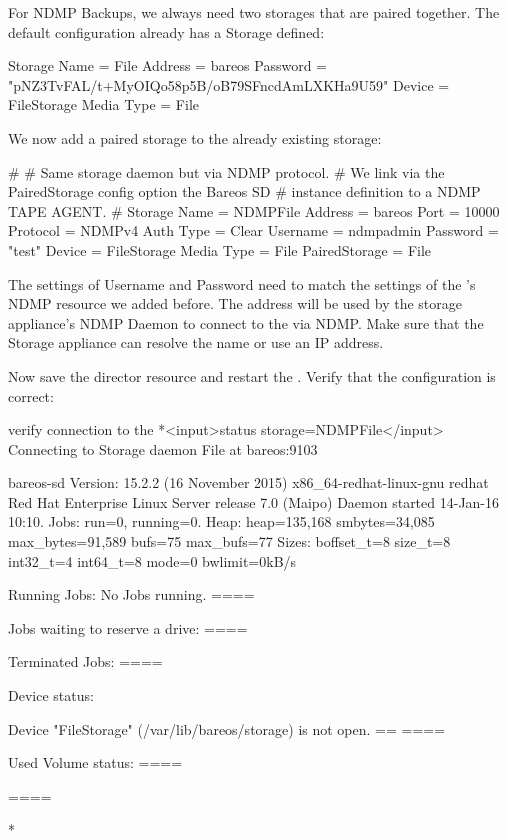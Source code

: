 For NDMP Backups, we always need two storages that are paired together.
The default configuration already has a Storage  defined:

\begin{bconfig}{}
Storage {
  Name = File
  Address = bareos
  Password = "pNZ3TvFAL/t+MyOIQo58p5B/oB79SFncdAmLXKHa9U59"
  Device = FileStorage
  Media Type = File
}
\end{bconfig}

We now add a paired storage to the already existing  storage:
\begin{bconfig}{}
#
# Same storage daemon but via NDMP protocol.
# We link via the PairedStorage config option the Bareos SD
# instance definition to a NDMP TAPE AGENT.
#
Storage {
  Name = NDMPFile
  Address = bareos
  Port = 10000
  Protocol = NDMPv4
  Auth Type = Clear
  Username = ndmpadmin
  Password = "test"
  Device = FileStorage
  Media Type = File
  PairedStorage = File
}
\end{bconfig}

The settings of Username and Password need to match the settings of the \bareosSd's NDMP resource we added before.
The address will be used by the storage appliance's NDMP Daemon to connect to the \bareosSd via NDMP.
Make sure that the Storage appliance can resolve the name or use an IP address.

Now save the director resource and restart the \bareosDir.
Verify that the configuration is correct:

\begin{bconsole}{verify connection to the \bareosSd}
*<input>status storage=NDMPFile</input>
Connecting to Storage daemon File at bareos:9103

bareos-sd Version: 15.2.2 (16 November 2015) x86_64-redhat-linux-gnu redhat Red Hat Enterprise Linux Server release 7.0 (Maipo)
Daemon started 14-Jan-16 10:10. Jobs: run=0, running=0.
 Heap: heap=135,168 smbytes=34,085 max_bytes=91,589 bufs=75 max_bufs=77
 Sizes: boffset_t=8 size_t=8 int32_t=4 int64_t=8 mode=0 bwlimit=0kB/s

Running Jobs:
No Jobs running.
====

Jobs waiting to reserve a drive:
====

Terminated Jobs:
====

Device status:

Device "FileStorage" (/var/lib/bareos/storage) is not open.
==
====

Used Volume status:
====

====

*
\end{bconsole}

